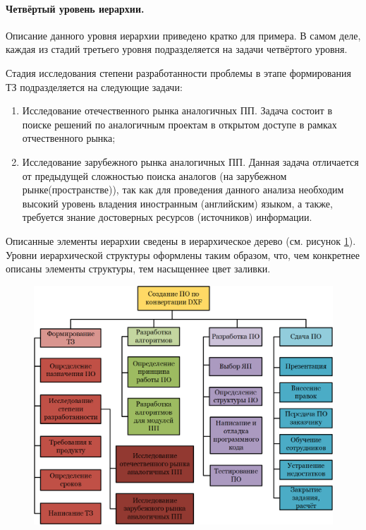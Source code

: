 \paragraph{Четвёртый уровень иерархии.}

Описание данного уровня иерархии приведено кратко для примера. В самом деле, каждая из стадий третьего уровня подразделяется на задачи четвёртого уровня.

Стадия исследования степени разработанности проблемы в этапе формирования ТЗ подразделяется на следующие задачи:
\begin{enumerate}
	\item Исследование отечественного рынка аналогичных ПП. Задача состоит в поиске решений по аналогичным проектам в открытом доступе в рамках отчественного рынка;
	\item Исследование зарубежного рынка аналогичных ПП. Данная задача отличается от предыдущей сложностью поиска аналогов (на зарубежном рынке(пространстве)), так как для проведения данного анализа необходим высокий уровень владения иностранным (английским) языком, а также, требуется знание достоверных ресурсов (источников) информации.
\end{enumerate}

Описанные элементы иерархии сведены в иерархическое дерево (см. рисунок \ref{fig:projektaufgaben}). Уровни иерархической структуры оформлены таким образом, что, чем конкретнее описаны элементы структуры, тем насыщеннее цвет заливки.

	
\begin{figure}[H]
	\centering
	\includegraphics[width=1.0\textwidth]{figures/projektaufgaben.png}
	\label{fig:projektaufgaben}
\end{figure}

